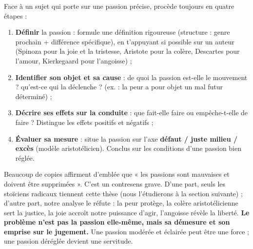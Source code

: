 \documentclass[11pt]{article}
\begin{document}
\begin{methode}
Face à un sujet qui porte sur une passion précise, procède toujours en quatre étapes :
\begin{enumerate}
\item \textbf{Définir} la passion : formule une définition rigoureuse (structure : genre prochain + différence spécifique), en t'appuyant si possible sur un auteur (Spinoza pour la joie et la tristesse, Aristote pour la colère, Descartes pour l'amour, Kierkegaard pour l'angoisse) ;
\item \textbf{Identifier son objet et sa cause} : de quoi la passion est-elle le mouvement ? qu'est-ce qui la déclenche ? (ex. : la peur a pour objet un mal futur déterminé) ;
\item \textbf{Décrire ses effets sur la conduite} : que fait-elle faire ou empêche-t-elle de faire ? Distingue les effets positifs et négatifs ;
\item \textbf{Évaluer sa mesure} : situe la passion sur l'axe \textbf{défaut / juste milieu / excès} (modèle aristotélicien). Conclus sur les conditions d'une passion bien réglée.
\end{enumerate}
\end{methode}

\begin{attention}
Beaucoup de copies affirment d'emblée que « les passions sont mauvaises et doivent être supprimées ». C'est un contresens grave. D'une part, seuls les stoïciens radicaux tiennent cette thèse (nous l'étudierons à la section suivante) ; d'autre part, notre analyse le réfute : la peur protège, la colère aristotélicienne sert la justice, la joie accroît notre puissance d'agir, l'angoisse révèle la liberté. \textbf{Le problème n'est pas la passion elle-même, mais sa démesure et son emprise sur le jugement.} Une passion modérée et éclairée peut être une force ; une passion déréglée devient une servitude.
\end{attention}
\end{document}

